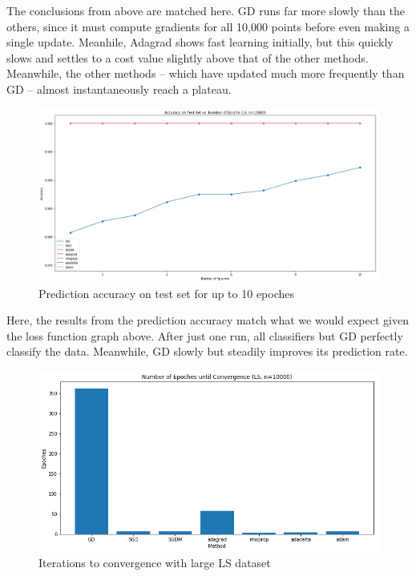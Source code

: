 \documentclass[twoside,11pt]{homework}
\begin{document}
The conclusions from above are matched here. GD runs far more slowly than the others, since it must compute gradients for all 10,000 points before even making a single update. Meanhile, Adagrad shows fast learning initially, but this quickly slows and settles to a cost value slightly above that of the other methods. Meanwhile, the other methods -- which have updated much more frequently than GD -- almost instantaneously reach a plateau.


\begin{figure}[H]
		\centering
		\includegraphics[scale=.3]{q5/sep_10000/acc.png}
		\caption{Prediction accuracy on test set for up to 10 epoches}
	\end{figure}

Here, the results from the prediction accuracy match what we would expect given the loss function graph above. After just one run, all classifiers but GD perfectly classify the data. Meanwhile, GD slowly but steadily improves its prediction rate.

\begin{figure}[H]
		\centering
		\includegraphics[scale=.5]{q5/sep_10000/time.png}
		\caption{Iterations to convergence with large LS dataset}
	\end{figure}
\end{document}
